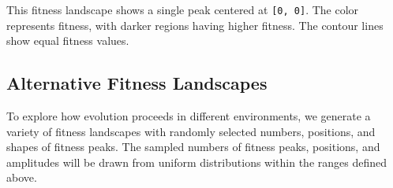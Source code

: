 \documentclass[
]{scrartcl}
\begin{document}
This fitness landscape shows a single peak centered at
\texttt{{[}0,\ 0{]}}. The color represents fitness, with darker regions
having higher fitness. The contour lines show equal fitness values.

\subsection{Alternative Fitness
Landscapes}\label{alternative-fitness-landscapes}

To explore how evolution proceeds in different environments, we generate
a variety of fitness landscapes with randomly selected numbers,
positions, and shapes of fitness peaks. The sampled numbers of fitness
peaks, positions, and amplitudes will be drawn from uniform
distributions within the ranges defined above.
\end{document}
